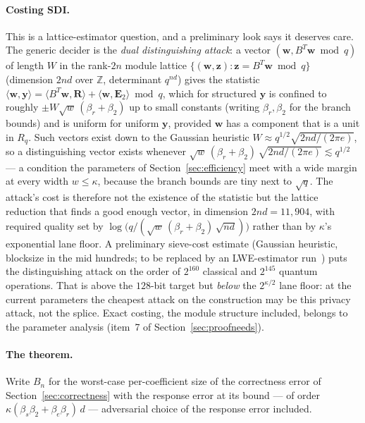 \documentclass[11pt]{article}
\newcommand{\R}{R_q}
\begin{document}
\paragraph{Costing SDI.}
This is a lattice-estimator question, and a preliminary look says it
deserves care.  The generic decider is the \emph{dual distinguishing
attack}: a vector $(\mathbf w,B^{T}\mathbf w\bmod q)$ of length $W$ in the
rank-$2n$ module lattice $\{(\mathbf w,\mathbf z):\mathbf z=B^{T}\mathbf
w\bmod q\}$ (dimension $2nd$ over $\mathbb Z$, determinant $q^{nd}$) gives
the statistic
$\langle\mathbf w,\mathbf y\rangle
 =\langle B^{T}\mathbf w,\mathbf R\rangle+\langle\mathbf w,\mathbf E_2\rangle
 \bmod q$,
which for structured $\mathbf y$ is confined to roughly
$\pm W\sqrt{w}\,(\beta_r+\beta_2)$ up to small constants (writing
$\beta_r,\beta_2$ for the branch bounds) and is uniform for uniform
$\mathbf y$, provided $\mathbf w$ has a component that is a unit in $\R$.
Such vectors exist down to the Gaussian heuristic
$W\approx q^{1/2}\sqrt{2nd/(2\pi e)}$, so a distinguishing vector exists
whenever
$\sqrt{w}\,(\beta_r+\beta_2)\,\sqrt{2nd/(2\pi e)}\lesssim q^{1/2}$
--- a condition the parameters of Section~\ref{sec:efficiency} meet with a
wide margin at every width $w\le\kappa$, because the branch bounds are tiny
next to $\sqrt{q}$.  The attack's cost is therefore not the existence of
the statistic but the lattice reduction that finds a good enough vector, in
dimension $2nd=11{,}904$, with required quality set by
$\log\bigl(q/(\sqrt{w}\,(\beta_r+\beta_2)\,\sqrt{nd})\bigr)$ rather than by
$\kappa$'s exponential lane floor.  A preliminary sieve-cost estimate
(Gaussian heuristic, blocksize in the mid hundreds; to be replaced by an
LWE-estimator run~\cite{APS15}) puts the distinguishing attack on the order
of $2^{160}$ classical and $2^{145}$ quantum operations.  That is above the
$128$-bit target but \emph{below} the $2^{\kappa/2}$ lane floor: at the
current parameters the cheapest attack on the construction may be this
privacy attack, not the splice.  Exact costing, the module structure
included, belongs to the parameter analysis (item~7 of
Section~\ref{sec:proofneeds}).

\paragraph{The theorem.}
Write $B_n$ for the worst-case per-coefficient size of the correctness error
of Section~\ref{sec:correctness} with the response error at its bound ---
of order $\kappa(\beta_s\beta_2+\beta_e\beta_r)\,d$ --- adversarial choice
of the response error included.
\end{document}
